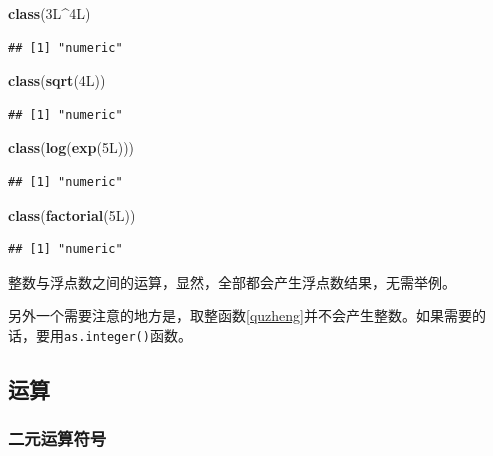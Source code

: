 \documentclass[]{book}
\newenvironment{Shaded}{\begin{snugshade}}{\end{snugshade}}
\newcommand{\KeywordTok}[1]{\textcolor[rgb]{0.13,0.29,0.53}{\textbf{#1}}}
\newcommand{\NormalTok}[1]{#1}
\newcommand{\OperatorTok}[1]{\textcolor[rgb]{0.81,0.36,0.00}{\textbf{#1}}}
\begin{document}
\begin{Shaded}
\begin{Highlighting}[]
\KeywordTok{class}\NormalTok{(3L}\OperatorTok{^}\NormalTok{4L)}
\end{Highlighting}
\end{Shaded}

\begin{verbatim}
## [1] "numeric"
\end{verbatim}

\begin{Shaded}
\begin{Highlighting}[]
\KeywordTok{class}\NormalTok{(}\KeywordTok{sqrt}\NormalTok{(4L))}
\end{Highlighting}
\end{Shaded}

\begin{verbatim}
## [1] "numeric"
\end{verbatim}

\begin{Shaded}
\begin{Highlighting}[]
\KeywordTok{class}\NormalTok{(}\KeywordTok{log}\NormalTok{(}\KeywordTok{exp}\NormalTok{(5L)))}
\end{Highlighting}
\end{Shaded}

\begin{verbatim}
## [1] "numeric"
\end{verbatim}

\begin{Shaded}
\begin{Highlighting}[]
\KeywordTok{class}\NormalTok{(}\KeywordTok{factorial}\NormalTok{(5L))}
\end{Highlighting}
\end{Shaded}

\begin{verbatim}
## [1] "numeric"
\end{verbatim}

整数与浮点数之间的运算，显然，全部都会产生浮点数结果，无需举例。

另外一个需要注意的地方是，取整函数\ref{quzheng}并不会产生整数。如果需要的话，要用\texttt{as.integer()}函数。

\hypertarget{arithmetic}{%
\subsection{运算}\label{arithmetic}}

\subsubsection{二元运算符号}
\end{document}
